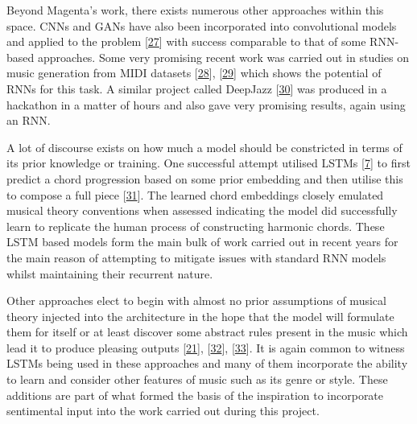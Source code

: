 \documentclass[12pt,]{article}
\begin{document}
Beyond Magenta's work, there exists numerous other approaches within
this space. CNNs and GANs have also been incorporated into convolutional
models and applied to the problem
{[}\protect\hyperlink{ref-yang2017midinet}{27}{]} with success
comparable to that of some RNN-based approaches. Some very promising
recent work was carried out in studies on music generation from MIDI
datasets {[}\protect\hyperlink{ref-hilschermusic}{28}{]},
{[}\protect\hyperlink{ref-wyse2018real}{29}{]} which shows the potential
of RNNs for this task. A similar project called DeepJazz
{[}\protect\hyperlink{ref-kim2016deepjazz}{30}{]} was produced in a
hackathon in a matter of hours and also gave very promising results,
again using an RNN.

A lot of discourse exists on how much a model should be constricted in
terms of its prior knowledge or training. One successful attempt
utilised LSTMs {[}\protect\hyperlink{ref-gers1999learning}{7}{]} to
first predict a chord progression based on some prior embedding and then
utilise this to compose a full piece
{[}\protect\hyperlink{ref-brunner2017jambot}{31}{]}. The learned chord
embeddings closely emulated musical theory conventions when assessed
indicating the model did successfully learn to replicate the human
process of constructing harmonic chords. These LSTM based models form
the main bulk of work carried out in recent years for the main reason of
attempting to mitigate issues with standard RNN models whilst
maintaining their recurrent nature.

Other approaches elect to begin with almost no prior assumptions of
musical theory injected into the architecture in the hope that the model
will formulate them for itself or at least discover some abstract rules
present in the music which lead it to produce pleasing outputs
{[}\protect\hyperlink{ref-boulanger2012modeling}{21}{]},
{[}\protect\hyperlink{ref-kotecha2018generating}{32}{]},
{[}\protect\hyperlink{ref-colombo2018bachprop}{33}{]}. It is again
common to witness LSTMs being used in these approaches and many of them
incorporate the ability to learn and consider other features of music
such as its genre or style. These additions are part of what formed the
basis of the inspiration to incorporate sentimental input into the work
carried out during this project.
\end{document}
